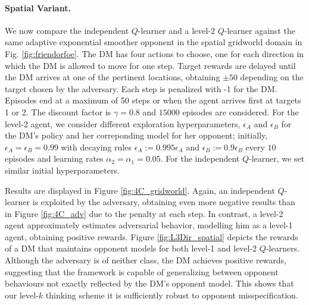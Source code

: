 






\paragraph{Spatial Variant.}


We now compare the independent $Q$-learner and a level-$2$ $Q$-learner against the
same adaptive exponential smoother opponent in the spatial gridworld domain
in Fig. \ref{fig:friendorfoe}. The DM has four actions to choose, one for each direction in which the DM is allowed to move for one step. Target rewards 
are delayed until the DM arrives at one of the pertinent locations, 
obtaining $\pm 50$ depending on the target chosen by the adversary.
Each step is penalized with -1 for the DM. Episodes end at a maximum of 50 steps or when the agent arrives first at targets 1 or 2. 
The discount factor is $\gamma = 0.8$ and $15000$ episodes are 
considered. For the level-2 agent, we consider different exploration hyperparameters, $\epsilon_A$ and $\epsilon_B$ for the DM's policy and her correponding model for her opponent;
initially,  $\epsilon_A = \epsilon_B = 0.99$ with decaying rules $\epsilon_A := 0.995\epsilon_A$ and $\epsilon_B := 0.9\epsilon_B$ every $10$ episodes and learning rates $\alpha_2 = \alpha_1 = 0.05$. For the independent $Q$-learner, we set similar initial hyperparameters.

Results are displayed
in Figure \ref{fig:4C_gridworld}. Again, an independent $Q$-learner is
exploited by the adversary, obtaining even more negative results  
than in 
Figure \ref{fig:4C_adv} due to the penalty at each step. In contrast,
a level-2 agent approximately estimates adversarial
behavior, modelling him as a level-1 agent, obtaining positive rewards. Figure \ref{fig:L3Dir_spatial} depicts the rewards of a DM that maintains 
opponent models for both level-1 and level-2 $Q$-learners. Although the adversary is of neither class, the DM achieves positive rewards,
suggesting that the framework is capable of generalizing between opponent behaviours not exactly reflected by the DM's opponent model.
This shows that our level-$k$ thinking scheme it is sufficiently robust to opponent misspecification.

